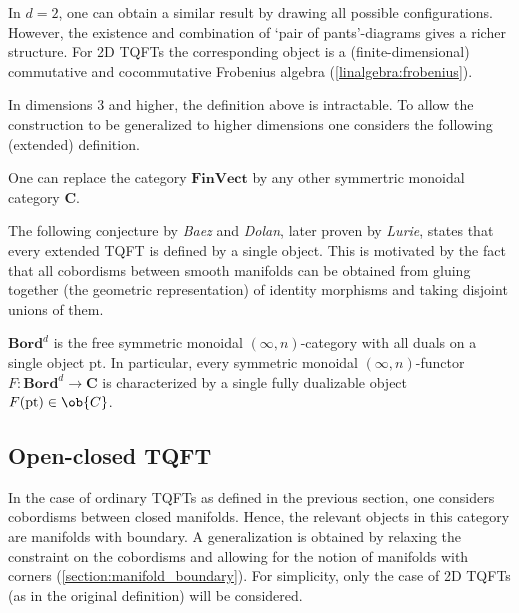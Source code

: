     \begin{example}[2D]
        In $d=2$, one can obtain a similar result by drawing all possible configurations. However, the existence and combination of `pair of pants'-diagrams gives a richer structure. For 2D TQFTs the corresponding object is a (finite-dimensional) commutative and cocommutative Frobenius algebra (\cref{linalgebra:frobenius}).
    \end{example}

    In dimensions 3 and higher, the definition above is intractable. To allow the construction to be generalized to higher dimensions one considers the following (extended) definition.
    \begin{remark}
        One can replace the category $\mathbf{FinVect}$ by any other symmertric monoidal category $\mathbf{C}$.
    \end{remark}

    The following conjecture by \textit{Baez} and \textit{Dolan}, later proven by \textit{Lurie}, states that every extended TQFT is defined by a single object. This is motivated by the fact that all cobordisms between smooth manifolds can be obtained from gluing together (the geometric representation) of identity morphisms and taking disjoint unions of them.
    \begin{theorem}
        $\mathbf{Bord}^d$ is the free symmetric monoidal $(\infty,n)$-category with all duals on a single object $\mathrm{pt}$. In particular, every symmetric monoidal $(\infty,n)$-functor $F:\mathbf{Bord}^d\rightarrow\mathbf{C}$ is characterized by a single fully dualizable object $F(\mathrm{pt})\in\ob{C}$.
    \end{theorem}

\subsection{Open-closed TQFT}

    In the case of ordinary TQFTs as defined in the previous section, one considers cobordisms between closed manifolds. Hence, the relevant objects in this category are manifolds with boundary. A generalization is obtained by relaxing the constraint on the cobordisms and allowing for the notion of manifolds with corners (\cref{section:manifold_boundary}). For simplicity, only the case of 2D TQFTs (as in the original definition) will be considered.

